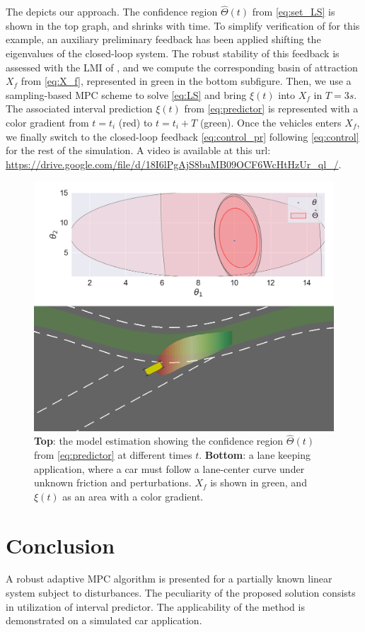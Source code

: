 \documentclass[letterpaper, 10 pt, conference]{ieeeconf}  %
\begin{document}
The  depicts our approach. The confidence region $\hat{\Theta}(t)$ from \eqref{eq:set_LS} is shown in the top graph, and shrinks with time. To simplify verification of  for this example, an auxiliary preliminary feedback has been applied shifting the eigenvalues of the closed-loop system. The robust stability of this feedback is assessed with the LMI of , and we compute the corresponding basin of attraction $X_f$ from \eqref{eq:X_f}, represented in green in the bottom subfigure. Then, we use a sampling-based MPC scheme \cite{HomemDeMello2014} to solve \eqref{eq:LS} and bring $\xi(t)$ into $X_f$ in $T=3s$.  The associated interval prediction $\xi(t)$ from \eqref{eq:predictor} is represented with a color gradient from $t=t_i$ (red) to $t=t_i+T$ (green). Once the vehicles enters $X_f$, we finally switch to the closed-loop feedback \eqref{eq:control_pr} following \eqref{eq:control} for the rest of the simulation. A video is available at this url: \url{https://drive.google.com/file/d/18I6lPgAjS8buMB09OCF6WcHtHzUr_ql_/}.
\begin{figure}
    \centering
    \includegraphics[width=\linewidth]{img/lane-keeping.png}
    \caption{\textbf{Top}: the model estimation showing the confidence region $\hat{\Theta}(t)$ from \eqref{eq:predictor} at different times $t$. \textbf{Bottom}: a lane keeping application, where a car must follow a lane-center curve under unknown friction and perturbations. $X_f$ is shown in green, and $\xi(t)$ as an area with a color gradient.}
    \label{fig:lane-keeping}
\end{figure}

\section*{Conclusion}

A robust adaptive MPC algorithm is presented for a partially known
linear system subject to disturbances. The peculiarity of the proposed
solution consists in utilization of interval predictor. The applicability
of the method is demonstrated on a simulated car application.



\end{document}

